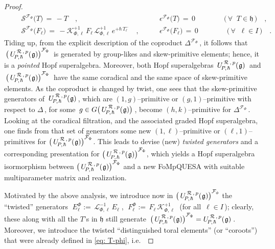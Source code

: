 \documentclass[12pt,reqno,twoside,a4paper]{amsart}
\numberwithin{equation}{section}
\theoremstyle{definition}
\newtheorem{free text}[lema]{}
\theoremstyle{remark}
\newcommand{\R}{{\mathcal R}}
\newcommand{\F}{{\mathcal F}}
\def \K {\mathcal{K}}
\def \L {\mathcal{L}}
\def \SS {\mathcal{S}}
\def \lieg{\mathfrak{g}}
\def \lieh{\mathfrak{h}}
\def \uRpPhg{U^{\,\R\,,\,p}_{\!P,\hskip0,7pt\hbar}(\hskip0,5pt\lieg)}
\theoremstyle{plain}
\begin{document}
\begin{proof}
$$\begin{matrix}
%
   \qquad
 \SS^{\scriptscriptstyle \F_\Phi}\big(T\big)  \, = \,  -T  \quad ,  \phantom{\Big|^|}
  &  \qquad
 \epsilon^{\scriptscriptstyle \F_\Phi}\big(T\big) \, = \, 0   \qquad \qquad  \big(\, \forall \;\; T \in \lieh \,\big)\quad ,
 \\
%
   \qquad   \SS^{\scriptscriptstyle \F_\Phi}\big(F_\ell\big)  \, = \,
   - \K_{\Phi, \ell}^{+1} \, F_\ell \, \L_{\Phi, \ell}^{+1} \, e^{+\hbar \, T^-_\ell}  \quad ,
   &  \qquad  \epsilon^{\scriptscriptstyle \F_\Phi}\big(F_\ell\big) \, = \, 0   \qquad \qquad  \big(\, \forall \;\; \ell \in I \,\big)\quad .
%
\end{matrix}  $$
%
   \indent   Tiding up, from the explicit description of the coproduct  $ \Delta^{\scriptscriptstyle \F_\Phi} \, $,  it follows that  $ \, {\big(\, \uRpPhg \big)}^{\F_\Phi} \, $  is generated by group-likes and skew-primitive elements; hence, it is a  \textsl{pointed\/}  Hopf superalgebra.  Moreover, both Hopf superalgebras  $ \,  \uRpPhg  \, $  and  $ \, {\big(\, \uRpPhg \big)}^{\F_\Phi} \, $  have the same coradical and the same space of skew-primitive elements.  As the coproduct is changed by twist, one sees that the skew-primitive generators of  $ \, \uRpPhg  \, $,  which are  $ (1,g) $--primitive  or $ (g,1) $--primitive  with respect to  $ \Delta \, $,  for some  $ \, g \in G\big(\, \uRpPhg \big) \, $,  become  $ (h,k) $--primitive  for $ \Delta^{\scriptscriptstyle \F_\Phi} \, $.  Looking at the coradical filtration, and the associated graded Hopf superalgebra,  one finds from that set of generators some new  $ (1,\ell) $--primitive  or  $ (\ell,1) $--primitives  for  $ {\big(\, \uRpPhg \big)}^{\F_\Phi} $.  This leads to devise (new)  \textit{twisted generators\/}  and a corresponding presentation for  $ {\big(\, \uRpPhg \big)}^{\F_\Phi} $,  which yields a Hopf superalgebra isormorphism between  $ {\big(\, \uRpPhg \big)}^{\F_\Phi} $  and a new FoMpQUESA with suitable multiparameter matrix and realization.
                                                                   \par
   Motivated by the above analysis, we introduce now in  $ {\big(\, \uRpPhg \big)}^{\F_\phi} $  the ``twisted'' generators
%
  $ \; E^{\scriptscriptstyle \Phi}_\ell := \, \L_{\Phi, \ell}^{-1} \, E_\ell \; $,
 $ \; F^{\scriptscriptstyle \Phi}_\ell := \, F_\ell \, \K_{\Phi, \ell}^{+1} \; $
%
  (for all  $ \, \ell \in I \, $);  clearly, these along with all the  $ T $'s  in  $ \lieh $  still generate  $ \,  {\big(\, \uRpPhg \big)}^{\F_\Phi} = \uRpPhg \, $.  Moreover, we introduce the twisted ``distinguished toral elements'' (or ``coroots'') that were already defined in  \eqref{eq: T-phi},  i.e.\

\end{proof}
\end{document}

